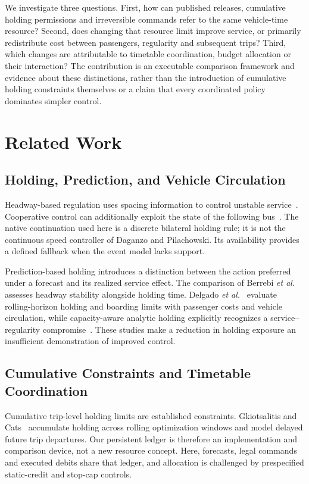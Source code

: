We investigate three questions. First, how can published releases, cumulative holding permissions and irreversible commands refer to the same vehicle-time resource? Second, does changing that resource limit improve service, or primarily redistribute cost between passengers, regularity and subsequent trips? Third, which changes are attributable to timetable coordination, budget allocation or their interaction? The contribution is an executable comparison framework and evidence about these distinctions, rather than the introduction of cumulative holding constraints themselves or a claim that every coordinated policy dominates simpler control.

\section{Related Work}
\subsection{Holding, Prediction, and Vehicle Circulation}
Headway-based regulation uses spacing information to control unstable service~\cite{daganzo2009headway}. Cooperative control can additionally exploit the state of the following bus~\cite{daganzo2011cooperation}. The native continuation used here is a discrete bilateral holding rule; it is not the continuous speed controller of Daganzo and Pilachowski. Its availability provides a defined fallback when the event model lacks support.

Prediction-based holding introduces a distinction between the action preferred under a forecast and its realized service effect. The comparison of Berrebi \emph{et al.}~\cite{berrebi2018comparing} assesses headway stability alongside holding time. Delgado \emph{et al.}~\cite{delgado2012holding} evaluate rolling-horizon holding and boarding limits with passenger costs and vehicle circulation, while capacity-aware analytic holding explicitly recognizes a service--regularity compromise~\cite{gkiotsalitis2020capacity}. These studies make a reduction in holding exposure an insufficient demonstration of improved control.

\subsection{Cumulative Constraints and Timetable Coordination}
Cumulative trip-level holding limits are established constraints. Gkiotsalitis and Cats~\cite{gkiotsalitis2019multiconstrained} accumulate holding across rolling optimization windows and model delayed future trip departures. Our persistent ledger is therefore an implementation and comparison device, not a new resource concept. Here, forecasts, legal commands and executed debits share that ledger, and allocation is challenged by prespecified static-credit and stop-cap controls.

